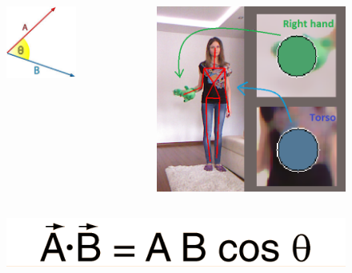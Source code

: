 \documentclass{beamer}
\begin{document}
\begin{frame}

\begin{columns}[c] %

\begin{figure}
\includegraphics[width=0.45\linewidth]{punto.JPG}
\end{figure}


\begin{figure}
\includegraphics[width=0.7\linewidth]{conversion.png}
\end{figure}

\end{columns}

\begin{figure}
\includegraphics[width=0.5\linewidth]{prod_punto.png}
\end{figure}


\end{frame}
\end{document}

